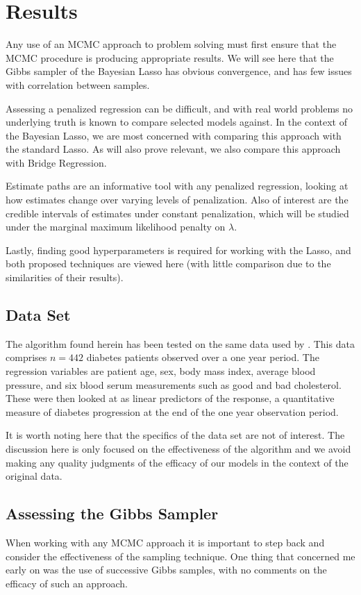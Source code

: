 \documentclass{uwstat572}
\begin{document}
\section{Results}
Any use of an MCMC approach to problem solving must first ensure that the MCMC procedure is producing appropriate results. We will see here that the Gibbs sampler of the Bayesian Lasso has obvious convergence, and has few issues with correlation between samples.

Assessing a penalized regression can be difficult, and with real world problems no underlying truth is known to compare selected models against. In the context of the Bayesian Lasso, we are most concerned with comparing this approach with the standard Lasso. As will also prove relevant, we also compare this approach with Bridge Regression. 

Estimate paths are an informative tool with any penalized regression, looking at how estimates change over varying levels of penalization. Also of interest are the credible intervals of estimates under constant penalization, which will be studied under the marginal maximum likelihood penalty on $\lambda$.

Lastly, finding good hyperparameters is required for working with the Lasso, and both proposed techniques are viewed here (with little comparison due to the similarities of their results).

\subsection{Data Set}
The algorithm found herein has been tested on the same data used by \cite{efron2004least}. This data comprises $n=442$ diabetes patients observed over a one year period. The regression variables are patient age, sex, body mass index, average blood pressure, and six blood serum measurements such as good and bad cholesterol. These were then looked at as linear predictors of the response, a quantitative measure of diabetes progression at the end of the one year observation period.

It is worth noting here that the specifics of the data set are not of interest. The discussion here is only focused on the effectiveness of the algorithm and we avoid making any quality judgments of the efficacy of our models in the context of the original data.

\subsection{Assessing the Gibbs Sampler}
When working with any MCMC approach it is important to step back and consider the effectiveness of the sampling technique. One thing that concerned me early on was the use of successive Gibbs samples, with no comments on the efficacy of such an approach.
\end{document}
